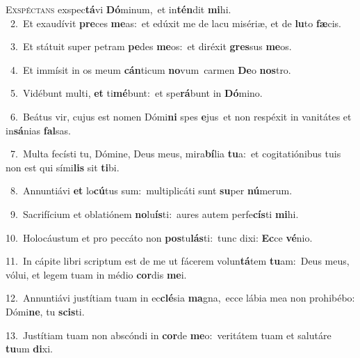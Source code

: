 \lettrine{\initial\textcolor{\initialcolor}{E}}{xspéctans} exspec\-\textbf{tá}\-vi \textbf{Dó}\-minum,~\star et in\-\textbf{tén}\-dit \textbf{mi}\-hi.\\
{\numbfont\textcolor{\numbcolor}{~2.}}~Et exaudívit \textbf{pre}\-ces \textbf{me}\-as:~\star et edúxit me de lacu misériæ, et de \textbf{lu}\-to \textbf{fæ}\-cis.\par
{\numbfont\textcolor{\numbcolor}{~3.}}~Et státuit super petram \textbf{pe}\-des \textbf{me}\-os:~\star et diréxit \textbf{gres}\-sus \textbf{me}\-os.\par
{\numbfont\textcolor{\numbcolor}{~4.}}~Et immísit in os meum \textbf{cán}\-ticum \textbf{no}\-vum~\star carmen \textbf{De}\-o \textbf{nos}\-tro.\par
{\numbfont\textcolor{\numbcolor}{~5.}}~Vidébunt multi, \textbf{et} ti\-\textbf{mé}\-bunt:~\star et spe\-\textbf{rá}\-bunt in \textbf{Dó}\-mino.\par
{\numbfont\textcolor{\numbcolor}{~6.}}~Beátus vir, cujus est nomen Dómi\textbf{ni} spes \textbf{e}\-jus~\star et non respéxit in vanitátes et in\-\textbf{sá}\-nias \textbf{fal}\-sas.\par
{\numbfont\textcolor{\numbcolor}{~7.}}~Multa fecísti tu, Dómine, Deus meus, mira\-\textbf{bí}\-lia \textbf{tu}\-a:~\star et cogitatiónibus tuis non est qui sími\textbf{lis} sit \textbf{ti}\-bi.\par
{\numbfont\textcolor{\numbcolor}{~8.}}~Annuntiávi \textbf{et} lo\-\textbf{cú}\-tus sum:~\star multiplicáti sunt \textbf{su}\-per \textbf{nú}\-merum.\par
{\numbfont\textcolor{\numbcolor}{~9.}}~Sacrifícium et oblatiónem \textbf{no}\-lu\-\textbf{ís}\-ti:~\star aures autem perfe\-\textbf{cís}\-ti \textbf{mi}\-hi.\par
{\numbfont\textcolor{\numbcolor}{10.}}~Holocáustum et pro peccáto non \textbf{pos}\-tu\-\textbf{lás}\-ti:~\star tunc dixi: \textbf{Ec}\-ce \textbf{vé}\-nio.\par
{\numbfont\textcolor{\numbcolor}{11.}}~In cápite libri scriptum est de me ut fácerem volun\-\textbf{tá}\-tem \textbf{tu}\-am:~\star Deus meus, vólui, et legem tuam in médio \textbf{cor}\-dis \textbf{me}\-i.\par
{\numbfont\textcolor{\numbcolor}{12.}}~Annuntiávi justítiam tuam in ec\-\textbf{clé}\-sia \textbf{ma}\-gna,~\star ecce lábia mea non prohibébo: Dómi\-\textbf{ne}\-, tu \textbf{scis}\-ti.\par
{\numbfont\textcolor{\numbcolor}{13.}}~Justítiam tuam non abscóndi in \textbf{cor}\-de \textbf{me}\-o:~\star veritátem tuam et salutáre \textbf{tu}\-um \textbf{di}\-xi.\par
